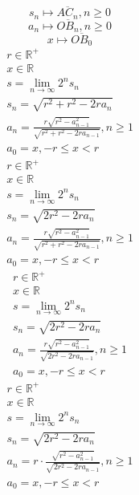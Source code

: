 \documentclass[a4paper,12pt]{report}
\begin{document}
\begin{equation}
s_n \mapsto \overline{AC_n}, n \geq 0
\end{equation}
\begin{equation}
a_n \mapsto \overline{OB_n}, n \geq 0
\end{equation}
\begin{equation}
x \mapsto \overline{OB_{0}}
\end{equation}
\begin{subequations}
\begin{gather}
r \in \mathbb{R}^+ \\
x \in \mathbb{R} \\
s = \lim \limits_{n \to \infty} 2^n s_n \\
s_n = \sqrt{r^2 + r^2 - 2ra_n} \\
a_n = \frac{r \sqrt{r^2 - a_{n-1}^2}}{\sqrt{r^2 + r^2 - 2ra_{n-1}}}, n \geq 1 \\
a_0 = x, -r \leq x < r
\end{gather}
\end{subequations}
\begin{subequations}
\begin{gather}
r \in \mathbb{R}^+ \\
x \in \mathbb{R} \\
s = \lim \limits_{n \to \infty} 2^n s_n \\
s_n = \sqrt{2r^2 - 2ra_n} \\
a_n = \frac{r \sqrt{r^2 - a_{n-1}^2}}{\sqrt{r^2 + r^2 - 2ra_{n-1}}}, n \geq 1 \\
a_0 = x, -r \leq x < r
\end{gather}
\end{subequations}
\begin{subequations}
\begin{gather}
r \in \mathbb{R}^+ \\
x \in \mathbb{R} \\
s = \lim \limits_{n \to \infty} 2^n s_n \\
s_n = \sqrt{2r^2 - 2ra_n} \\
a_n = \frac{r \sqrt{r^2 - a_{n-1}^2}}{\sqrt{2r^2 - 2ra_{n-1}}}, n \geq 1 \\
a_0 = x, -r \leq x < r
\end{gather}
\end{subequations}
\begin{subequations}
\begin{gather}
r \in \mathbb{R}^+ \\
x \in \mathbb{R} \\
s = \lim \limits_{n \to \infty} 2^n s_n \\
s_n = \sqrt{2r^2 - 2ra_n} \\
a_n = r \cdot \frac{\sqrt{r^2 - a_{n-1}^2}}{\sqrt{2r^2 - 2ra_{n-1}}}, n \geq 1 \\
a_0 = x, -r \leq x < r
\end{gather}
\end{subequations}
\end{document}
